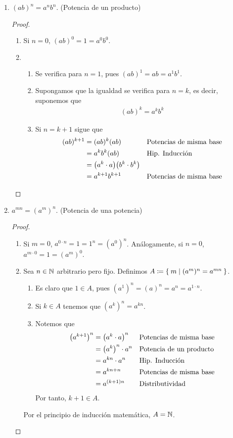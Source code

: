 \begin{enumerate}[label=\alph*)]
 \item $(ab)^n = a^nb^n$. (Potencia de un producto)
 \begin{proof}\leavevmode
  \begin{enumerate}[label=\Roman*)]
    \item Si $n=0$, $(ab)^0 = 1 = a^0b^0$.
    \item \begin{enumerate}[label=\roman*)]
      \item Se verifica para $n=1$, pues $(ab)^1=ab=a^1b^1$.
      \item Supongamos que la igualdad se verifica para $n=k$, es decir, suponemos que \begin{align*}
        (ab)^k = a^kb^k
      \end{align*}
      \item Si $n=k+1$ sigue que \begin{align*}
        (ab)^{k+1} &= (ab)^k (ab) && \text{Potencias de misma base}\\
        &= a^kb^k (ab) && \text{Hip. Inducción}\\
        &= \big(a^k \cdot a\big) \big(b^k \cdot b^k\big)\\
        &= a^{k+1} b^{k+1} && \text{Potencias de misma base} \qedhere 
      \end{align*}
    \end{enumerate}
  \end{enumerate}
 \end{proof}

 \item $a^{mn} = (a^m)^n$. (Potencia de una potencia)
 \begin{proof}\leavevmode
  \begin{enumerate}[label=\Roman*)]
    \item Si $m=0$, $a^{0\cdot n} = 1 = 1^n = (a^0)^n$. Análogamente, si $n=0$, $a^{m\cdot 0} = 1 = (a^m)^0$.
    \item Sea $n\in \mathbb{N}$ arbitrario pero fijo. Definimos $A\coloneqq \Set{m|(a^m)^n = a^{mn}}$.
    \begin{enumerate}[label=\roman*)]
      \item Es claro que $1\in A$, pues $(a^1)^n = (a)^n = a^n = a^{1\cdot n}$.
      \item Si $k\in A$ tenemos que $(a^k)^n = a^{kn}$.
      \item Notemos que
      \begin{align*}
        \qty(a^{k+1})^n &= \qty(a^k\cdot a)^n && \text{Potencias de misma base}\\
        &= \qty(a^k)^n \cdot a^n && \text{Potencia de un producto}\\
        &= a^{kn} \cdot a^n && \text{Hip. Inducción}\\
        &= a^{kn+n} && \text{Potencias de misma base}\\
        &= a^{(k+1)n} && \text{Distributividad}
      \end{align*}
      Por tanto, $k+1\in A$.
    \end{enumerate}
    Por el principio de inducción matemática, $A=\mathbb{N}$.
  \end{enumerate}
 \end{proof}
 

\end{enumerate}
